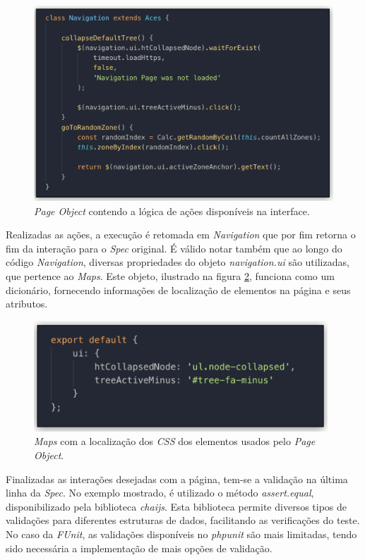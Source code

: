 \begin{figure}[H]
    \centering
    \includegraphics[width=15cm]{source/4-solucao/images/fate-page-object.png}
    \caption{\emph{Page Object} contendo a lógica de ações disponíveis na interface.}
    \label{fig:fate-page-object}
\end{figure}

Realizadas as ações, a execução é retomada em \emph{Navigation} que por fim retorna o fim da interação para o \emph{Spec} original. É válido notar também que ao longo do código \emph{Navigation}, diversas propriedades do objeto \emph{navigation.ui} são utilizadas, que pertence ao \emph{Maps}. Este objeto, ilustrado na figura \ref{fig:fate-maps}, funciona como um dicionário, fornecendo informações de localização de elementos na página e seus atributos.

\begin{figure}[H]
    \centering
    \includegraphics[width=11cm]{source/4-solucao/images/fate-maps.png}
    \caption{\emph{Maps} com a localização dos \emph{CSS} dos elementos usados pelo \emph{Page Object}.}
    \label{fig:fate-maps}
\end{figure}

Finalizadas as interações desejadas com a página, tem-se a validação na última linha da \emph{Spec}. No exemplo mostrado, é utilizado o método \emph{assert.equal}, disponibilizado pela biblioteca \emph{chaijs}. Esta biblioteca permite diversos tipos de validações para diferentes estruturas de dados, facilitando as verificações do teste. No caso da \emph{FUnit}, as validações disponíveis no \emph{phpunit} são mais limitadas, tendo sido necessária a implementação de mais opções de validação.

